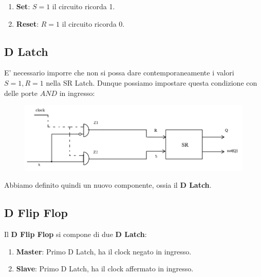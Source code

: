 \documentclass{article}
\begin{document}
\begin{enumerate}
    \item \textbf{Set}: $S=1$ il circuito ricorda 1.
    \item \textbf{Reset}: $R=1$ il circuito ricorda 0.
\end{enumerate}

\newpage

\subsection{D Latch} E' necessario imporre che non si possa dare contemporaneamente i valori $S=1, R=1$ nella SR Latch. Dunque possiamo impostare questa condizione con delle porte $AND$ in ingresso:

\begin{figure}[htbp]
    \includegraphics[scale=0.4]{img/memorie3.png}
    \centering
\end{figure}

Abbiamo definito quindi un nuovo componente, ossia il \textbf{D Latch}.

\subsection{D Flip Flop}

Il \textbf{D Flip Flop} si compone di due \textbf{D Latch}:
\begin{enumerate}
    \item \textbf{Master}: Primo D Latch, ha il clock negato in ingresso.
    \item \textbf{Slave}: Primo D Latch, ha il clock affermato in ingresso.
\end{enumerate}
\end{document}
